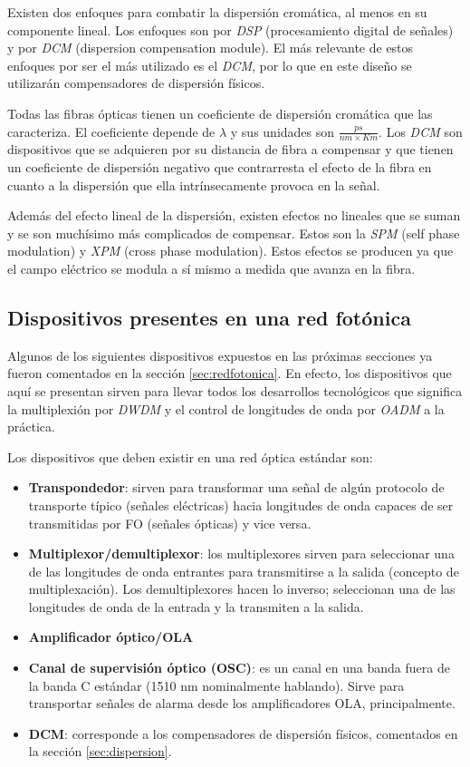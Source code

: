 Existen dos enfoques para combatir la dispersión cromática, al menos
en su componente lineal. Los enfoques son por \emph{DSP}
(procesamiento digital de señales) y por \emph{DCM} (dispersion
compensation module). El más relevante de estos enfoques por ser el
más utilizado es el \emph{DCM}, por lo que en este diseño se
utilizarán compensadores de dispersión físicos.

Todas las fibras ópticas tienen un coeficiente de dispersión cromática
que las caracteriza. El coeficiente depende de $\lambda$ y sus
unidades son $\frac{ps}{nm \times Km}$. Los \emph{DCM} son dispositivos
que se adquieren por su distancia de fibra a compensar y que tienen un
coeficiente de dispersión negativo que contrarresta el efecto de la
fibra en cuanto a la dispersión que ella intrínsecamente provoca en la
señal.

Además del efecto lineal de la dispersión, existen efectos no lineales
que se suman y se son muchísimo más complicados de compensar. Estos
son la \emph{SPM} (self phase modulation) y \emph{XPM} (cross phase
modulation). Estos efectos se producen ya que el campo eléctrico se
modula a sí mismo a medida que avanza en la fibra.

\subsection{Dispositivos presentes en una red fotónica}
\label{sec:dispositivos}

Algunos de los siguientes dispositivos expuestos en las próximas
secciones ya fueron comentados en la sección \ref{sec:redfotonica}. En
efecto, los dispositivos que aquí se presentan sirven para llevar
todos los desarrollos tecnológicos que significa la multiplexión por
\emph{DWDM} y el control de longitudes de onda por \emph{OADM} a la
práctica.

Los dispositivos que deben existir en una red óptica estándar son:
\begin{itemize}
\item \textbf{Transpondedor}: sirven para transformar una señal de
  algún protocolo de transporte típico (señales eléctricas) hacia
  longitudes de onda capaces de ser transmitidas por FO (señales
  ópticas) y vice versa.
\item \textbf{Multiplexor/demultiplexor}: los multiplexores sirven
  para seleccionar una de las longitudes de onda entrantes para
  transmitirse a la salida (concepto de multiplexación). Los
  demultiplexores hacen lo inverso; seleccionan una de las longitudes
  de onda de la entrada y la transmiten a la salida.
\item \textbf{Amplificador óptico/OLA}
\item \textbf{Canal de supervisión óptico (OSC)}: es un canal en una
  banda fuera de la banda C estándar (1510 nm nominalmente
  hablando). Sirve para transportar señales de alarma desde los
  amplificadores OLA, principalmente.
\item \textbf{DCM}: corresponde a los compensadores de dispersión
  físicos, comentados en la sección \ref{sec:dispersion}.
\end{itemize}